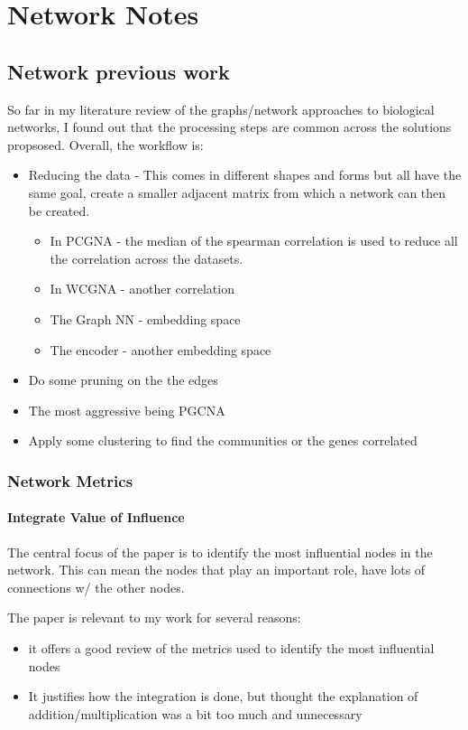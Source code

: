\section{Network Notes}

\subsection{Network previous work}

So far in my literature review of the graphs/network approaches to biological networks, I found out that the processing steps are common across the solutions propsosed. Overall, the workflow is:
\begin{itemize}
    \item Reducing the data - This comes in different shapes and forms but all have the same goal, create a smaller adjacent matrix from which a network can then be created.
    \begin{itemize}
        \item In PCGNA - the median of the spearman correlation is used to reduce all the correlation across the datasets.
        \item In WCGNA - another correlation
        \item The Graph NN - embedding space
        \item The encoder - another embedding space
    \end{itemize}
    \item Do some pruning on the the edges
    \item The most aggressive being PGCNA 
    \item Apply some clustering to find the communities or the genes correlated 
\end{itemize}



\subsubsection{Network Metrics}

\paragraph{Integrate Value of Influence}

The central focus of the paper is to identify the most influential nodes in the network. This can mean the nodes that play an important role, have lots of connections w/ the other nodes. 

The paper is relevant to my work for several reasons:
\begin{itemize}
    \item it offers a good review of the metrics used to identify the most influential nodes
    \item  It justifies how the integration is done, but thought the explanation of addition/multiplication was a bit too much and unnecessary
\end{itemize}

